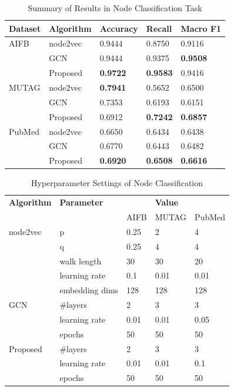 \documentclass[sigconf]{acmart}
\begin{document}
\begin{table}[!ht]
    \centering
    \caption{Summary of Results in Node Classification Task}
    \label{tab:6-nc}
    \begin{tabular}{lllll}
        \toprule
        \textbf{Dataset} & \textbf{Algorithm} & \textbf{Accuracy} & \textbf{Recall} & \textbf{Macro F1}\\
        \midrule
        AIFB & node2vec & 0.9444 & 0.8750 & 0.9116\\
             & GCN & 0.9444 & 0.9375 & \textbf{0.9508}\\
             & Proposed & \textbf{0.9722} & \textbf{0.9583} & 0.9416\\
        MUTAG & node2vec & \textbf{0.7941} & 0.5652 & 0.6500\\
              & GCN & 0.7353 & 0.6193 & 0.6151\\
              & Proposed & 0.6912 & \textbf{0.7242} & \textbf{0.6857}\\
        PubMed & node2vec & 0.6650 & 0.6434 & 0.6438\\
               & GCN & 0.6770 & 0.6443 & 0.6482\\
               & Proposed & \textbf{0.6920} & \textbf{0.6508} & \textbf{0.6616}\\
        \bottomrule
    \end{tabular}
\end{table}

\begin{table}[!ht]
    \centering
    \caption{Hyperparameter Settings of Node Classification}
    \label{tab:6-nc-hyper}
    \begin{tabular}{lllll}
        \toprule
        \textbf{Algorithm} & \textbf{Parameter} & &\textbf{Value}&\\
                           &              & AIFB & MUTAG & PubMed\\
        \midrule
        node2vec & p & 0.25 & 2 & 4\\
                 & q & 0.25 & 4 & 4\\
                 & walk length & 30 & 30 & 20\\
                 & learning rate & 0.1 & 0.01 & 0.01\\
                 & embedding dims & 128 & 128 & 128\\
        GCN & \#layers & 2 & 3 & 3\\
            & learning rate & 0.01 & 0.01 & 0.05\\
            & epochs & 50 & 50 & 50\\
        Proposed & \#layers & 2 & 3 & 3\\
            & learning rate & 0.01 & 0.01 & 0.1\\
            & epochs & 50 & 50 & 50\\
       \bottomrule
    \end{tabular}
\end{table}
\end{document}
